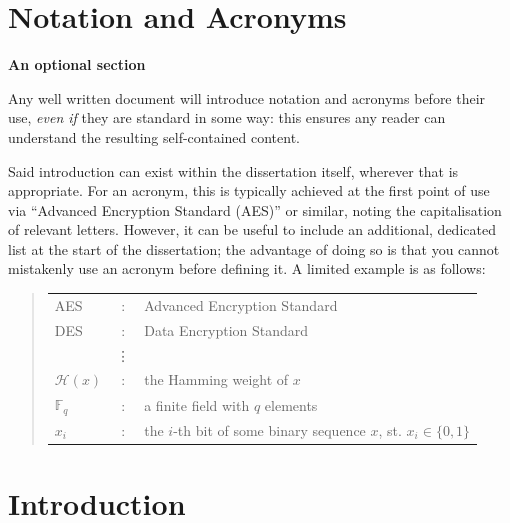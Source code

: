 \documentclass[oneside,%
                    author={Malak Hajji},
                    degree={BSc},
                    title={Designing An Accessible Computational Toolkit For Students},
                  subtitle={With Mixed Visual Abilities}]{dissertation}
\begin{document}

\chapter*{Notation and Acronyms}

{\bf An optional section}
\vspace{1cm} 

\noindent
Any well written document will introduce notation and acronyms before
their use, {\em even if} they are standard in some way: this ensures 
any reader can understand the resulting self-contained content.  

Said introduction can exist within the dissertation itself, wherever 
that is appropriate.  For an acronym, this is typically achieved at 
the first point of use via ``Advanced Encryption Standard (AES)'' or 
similar, noting the capitalisation of relevant letters.  However, it 
can be useful to include an additional, dedicated list at the start 
of the dissertation; the advantage of doing so is that you cannot 
mistakenly use an acronym before defining it.  A limited example is 
as follows:

\begin{quote}
\noindent
\begin{tabular}{lcl}
AES                 &:     & Advanced Encryption Standard                                         \\
DES                 &:     & Data Encryption Standard                                             \\
                    &\vdots&                                                                      \\
${\mathcal H}( x )$ &:     & the Hamming weight of $x$                                            \\
${\mathbb  F}_q$    &:     & a finite field with $q$ elements                                     \\
$x_i$               &:     & the $i$-th bit of some binary sequence $x$, st. $x_i \in \{ 0, 1 \}$ \\
\end{tabular}
\end{quote}


\mainmatter

\chapter{Introduction}
\label{chap:introduction}
\end{document}
